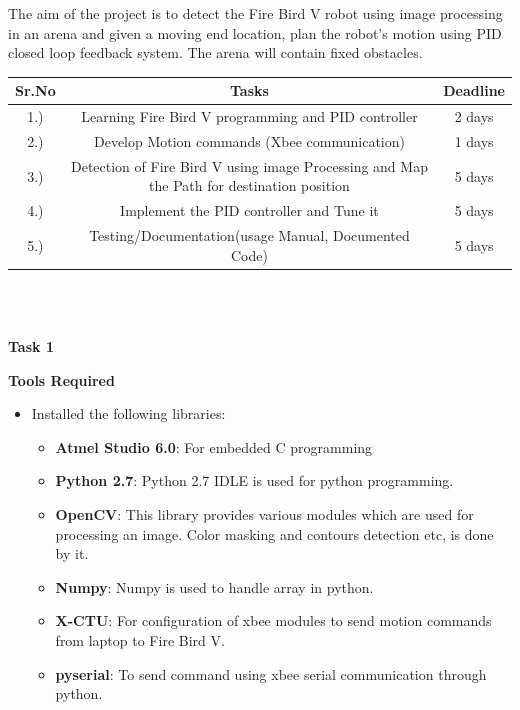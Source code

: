 \documentclass[report]{res}
\begin{document}
	The aim of the project is to detect the Fire Bird V robot using image processing in an arena and given a moving end location, plan the robot's motion using PID closed loop feedback system. The arena will contain fixed obstacles. \\
	
	\begin{tabular}{|c|c|c|}
		
		\hline
		\bf Sr.No & \bf Tasks & \bf Deadline \\ 
		\hline
		1.) & Learning Fire Bird V programming and PID controller & 2 days \\
		\hline
		2.) & Develop Motion commands (Xbee communication) & 1 days \\
		\hline
		3.) & Detection of Fire Bird V using image Processing and Map the Path for destination position & 5 days\\
		\hline
		4.) & Implement the PID controller and Tune it & 5 days
		\\ \hline
		5.) & Testing/Documentation(usage Manual, Documented Code) & 5 days
		\\ \hline
		
	\end{tabular} \\ \\
	
	\pagebreak
	
	\begin{center}
		\textbf{\Huge Task 1} \\
	\end{center}
	\begin{center}
		\textbf{\huge Tools Required} \\
	\end{center}
	
	\begin{itemize}
		\item Installed the following libraries:
		
		\begin{itemize}
			
			\item \textbf{Atmel Studio 6.0}: For embedded C programming 
			\item \textbf{Python 2.7}: Python 2.7 IDLE is used for python programming. 
			\item \textbf{OpenCV}: This library provides various modules which are used for processing an image. Color masking and contours detection etc, is done by it.
			\item \textbf{Numpy}: Numpy is used to handle array in python.
			\item \textbf{X-CTU}: For configuration of xbee modules to send motion commands from laptop to Fire Bird V.
			\item \textbf{pyserial}: To send command using xbee serial communication through python.
			
		\end{itemize}	
		
	\end{itemize}
	
\end{document}
